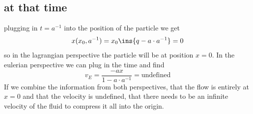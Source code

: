 \subsection{at that time}
plugging in \(t=a^{-1}\) into the position of the particle we get
\begin{equation}
    x(x_0,a^{-1})=x_0\ins{q-a\cdot a^{-1}}=0
\end{equation}
so in the lagrangian perspective the particle will be at position \(x=0\). In the eulerian perspective we can plug in the time and find 
\begin{equation}
    v_E = \frac{-ax}{1-a\cdot a^{-1}} = \text{undefined}
\end{equation}
If we combine the information from both perspectives, that the flow is entirely at \(x=0\) and that the velocity is undefined, that there needs to be an infinite velocity of the fluid to compress it all into the origin.